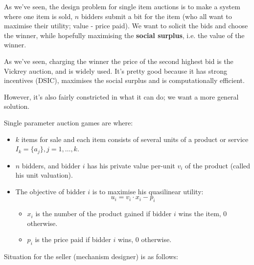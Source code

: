 



As we've seen, the design problem for single item auctions is to make a system
where one item is sold, $n$ bidders submit a bit for the item (who all want to
maximise their utility; value - price paid). We want to solicit the bids and
choose the winner, while hopefully maximising the \textbf{social surplus}, i.e.
the value of the winner.

As we've seen, charging the winner the price of the second highest bid is the
Vickrey auction, and is widely used. It's pretty good because it has strong
incentives (DSIC), maximises the social surplus and is computationally
efficient.

However, it's also fairly constricted in what it can do; we want a more general
solution.

Single parameter auction games are where:

\begin{itemize}
  \item $k$ items for sale and each item consists of several units of a product or service $I_k = \{a_j\}, j = 1, \dots, k$.
  \item $n$ bidders, and bidder $i$ has his private value per-unit $v_i$ of the 
  product (called his unit valuation).
  \item The objective of bidder $i$ is to maximise his quasilinear utility:
  \[
    u_i = v_i \cdot x_i - p_i
  \]
  \begin{itemize}
    \item $x_i$ is the number of the product gained if bidder $i$ wins the item,
    0 otherwise.
    \item $p_i$ is the price paid if bidder $i$ wins, 0 otherwise.
  \end{itemize}
\end{itemize}

Situation for the seller (mechanism designer) is as follows:


